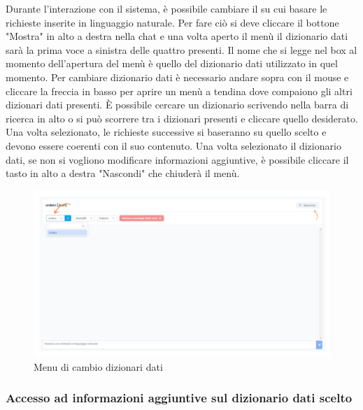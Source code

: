 Durante l'interazione con il sistema, è possibile cambiare il  su cui basare le richieste inserite in linguaggio naturale. Per fare ciò si deve cliccare il bottone "Mostra" in alto a destra nella chat e una volta aperto il menù il dizionario dati sarà la prima voce a sinistra delle quattro presenti. Il nome che si legge nel box al momento dell'apertura del menù è quello del dizionario dati utilizzato in quel momento. Per cambiare dizionario dati è necessario andare sopra con il mouse e cliccare la freccia in basso per aprire un menù a tendina dove compaiono gli altri dizionari dati presenti. È possibile cercare un dizionario scrivendo nella barra di ricerca in alto o si può scorrere tra i dizionari presenti e cliccare quello desiderato. Una volta selezionato, le richieste successive si baseranno su quello scelto e devono essere coerenti con il suo contenuto. Una volta selezionato il dizionario dati, se non si vogliono modificare informazioni aggiuntive, è possibile cliccare il tasto in alto a destra "Nascondi" che chiuderà il menù.

\begin{figure}[H]
  \centering
  \includegraphics[width=1\textwidth]{assets/cambio_dizionariodati.png}
  \caption{Menu di cambio dizionari dati}
\end{figure}

\subsubsection{Accesso ad informazioni aggiuntive sul dizionario dati scelto}

